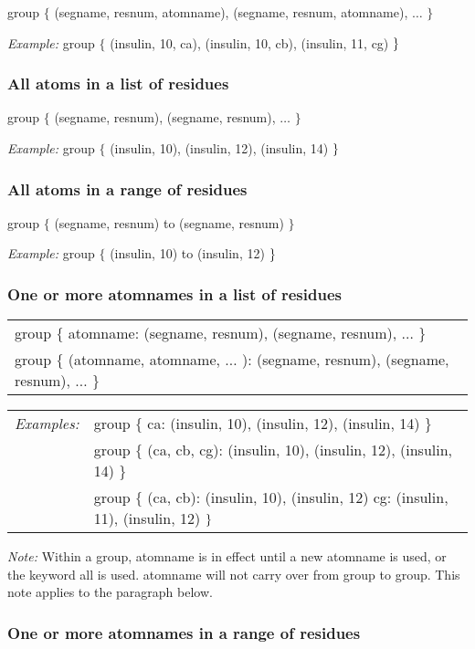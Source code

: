 group $\{$ (segname, resnum, atomname), (segname, resnum, atomname), $\ldots 
$ $\}$

{\em Example:} group $\{$ (insulin, 10, ca), (insulin, 10, cb), (insulin,
11, cg) $\}\medskip $

\subsubsection{All atoms in a list of residues}

group $\{$ (segname, resnum), (segname, resnum), $\ldots $ $\}$

{\em Example:} group $\{$ (insulin, 10), (insulin, 12), (insulin, 14) $%
\}\medskip $

\subsubsection{All atoms in a range of residues}

group $\{$ (segname, resnum) to (segname, resnum) $\}$

{\em Example:} group $\{$ (insulin, 10) to (insulin, 12) $\}\medskip $

\subsubsection{One or more atomnames in a list of residues}

\begin{tabular}{l}
group $\{$ atomname: (segname, resnum), (segname, resnum), $\ldots $ $\}$ \\ 
group $\{$ (atomname, atomname, $\ldots $ ): (segname, resnum), (segname,
resnum), $\ldots $ $\}$%
\end{tabular}

\begin{tabular}{ll}
{\em Examples:} & group $\{$ ca: (insulin, 10), (insulin, 12), (insulin, 14) 
$\}$ \\ 
& group $\{$ (ca, cb, cg): (insulin, 10), (insulin, 12), (insulin, 14) $\}$
\\ 
& group $\{$ (ca, cb): (insulin, 10), (insulin, 12) cg: (insulin, 11),
(insulin, 12) $\}\smallskip $%
\end{tabular}
\medskip 

{\em Note: }Within a group, atomname is in effect until a new atomname is
used, or the keyword all is used. atomname will not carry over from group to
group. This note applies to the paragraph below.\medskip 

\subsubsection{One or more atomnames in a range of residues}

